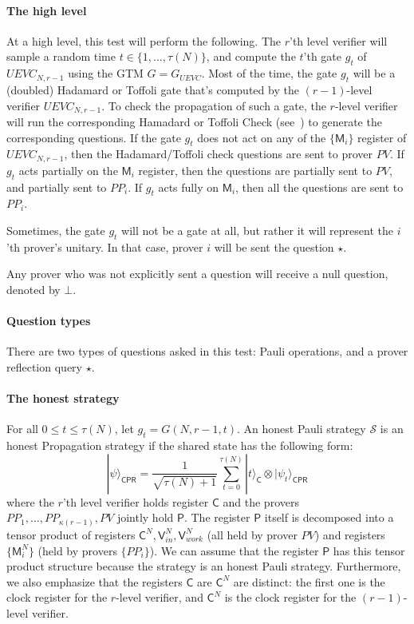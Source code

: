 \documentclass[11pt,letterpaper]{article}
\newcommand{\ket}[1]{|#1\rangle}
\newcommand{\sP}{{\mathsf{P}}}
\newcommand{\sC}{{\mathsf{C}}}
\newcommand{\sR}{{\mathsf{R}}}
\newcommand{\sV}{{\mathsf{V}}}
\newcommand{\sM}{{\mathsf{M}}}
\begin{document}
\paragraph{The high level} At a high level, this test will perform the following. The $r$'th level verifier will sample a random time $t \in \{1,\ldots,\tau(N)\}$, and compute the $t$'th gate $g_t$ of $UEVC_{N,r-1}$ using the GTM $G = G_{UEVC}$. Most of the time, the gate $g_t$ will be a (doubled) Hadamard or Toffoli gate that's computed by the $(r-1)$-level verifier $UEVC_{N,r-1}$. To check the propagation of such a gate, the $r$-level verifier will run the corresponding Hamadard or Toffoli Check (see~\cite{ji2016compression}) to generate the corresponding questions. If the gate $g_t$ does not act on any of the $\{ \sM_i\}$ register of $UEVC_{N,r-1}$, then the Hadamard/Toffoli check questions are sent to prover $PV$. If $g_t$ acts partially on the $\sM_i$ register, then the questions are partially sent to $PV$, and partially sent to $PP_i$. If $g_t$ acts fully on $\sM_i$, then all the questions are sent to $PP_i$.

Sometimes, the gate $g_t$ will not be a gate at all, but rather it will represent the $i$'th prover's unitary. In that case, prover $i$ will be sent the question $\star$.  

Any prover who was not explicitly sent a question will receive a null question, denoted by $\bot$.

\paragraph{Question types} There are two types of questions asked in this test: Pauli operations, and a prover reflection query $\star$.


\paragraph{The honest strategy} For all $0 \leq t \leq \tau(N)$, let $g_t = G(N,r-1,t)$. An honest Pauli strategy $\mathcal{S}$ is an honest Propagation strategy if the shared state has the following form:
\[
	\ket{\psi}_{\sC \sP \sR} = \frac{1}{\sqrt{\tau(N) + 1}} \sum_{t = 0}^{\tau(N)} \ket{t}_{\sC} \otimes \ket{\psi_t}_{\sC \sP \sR}
\]
where the $r$'th level verifier holds register $\sC$ and the provers $PP_1,\ldots,PP_{\kappa(r-1)},PV$ jointly hold $\sP$. The register $\sP$ itself is decomposed into a tensor product of registers $\sC^N, \sV^N_{in}, \sV^N_{work}$ (all held by prover $PV$) and registers $\{ \sM_i^N \}$ (held by provers $\{ PP_i \}$). We can assume that the register $\sP$ has this tensor product structure because the strategy is an honest Pauli strategy. Furthermore, we also emphasize that the registers $\sC$ are $\sC^N$ are distinct: the first one is the clock register for the $r$-level verifier, and $\sC^N$ is the clock register for the $(r-1)$-level verifier.
\end{document}
